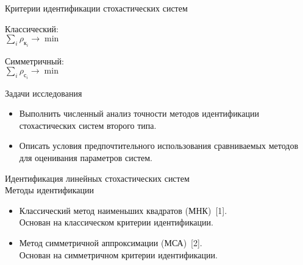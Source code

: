 \documentclass[hyperref={pdftex,unicode}]{beamer}
\begin{document}
\begin{frame}{Критерии идентификации стохастических систем}
  \begin{minipage}{0.45\linewidth}
    \centering
    
    Классический: \\
    \( \sum_i \rho_{\text{к}_i} \rightarrow \min \)
  \end{minipage}
  \hfill
  \begin{minipage}{0.45\linewidth}
    \centering
    
    Симметричный: \\
    \( \sum_i \rho_{\text{с}_i} \rightarrow \min \)
  \end{minipage}
\end{frame}

\begin{frame}{Задачи исследования}
  \begin{itemize}
  \item Выполнить численный анализ точности
    методов идентификации стохастических систем второго типа.
  \item Описать условия предпочтительного использования
    сравниваемых методов для оценивания параметров систем.
  \end{itemize}
\end{frame}

\begin{frame}{%
    Идентификация линейных стохастических систем \\
    \small{Методы идентификации}
  }
  \begin{itemize}
  \item Классический метод наименьших квадратов (МНК)~[1]. \\
    Основан на классическом критерии идентификации.
  \item Метод симметричной аппроксимации (МСА)~[2]. \\
    Основан на симметричном критерии идентификации.
  \end{itemize}
\end{frame}
\end{document}
